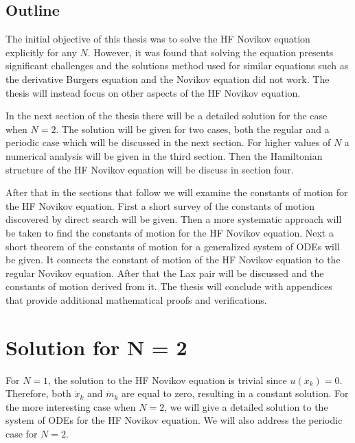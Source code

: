 \documentclass[english,master]{liumaiex}
\theoremstyle{plain}
\theoremstyle{definition}
\begin{document}
\subsection{Outline}

The initial objective of this thesis was to solve the HF Novikov equation explicitly for any $N$. However, it was found that solving the equation presents significant challenges and the solutions method used for similar equations such as the derivative Burgers equation and the Novikov equation did not work. The thesis will instead focus on other aspects of the HF Novikov equation.

In the next section of the thesis there will be a detailed solution for the case when $N = 2$. The solution will be given for two cases, both the regular and a periodic case which will be discussed in the next section. For higher values of $N$ a numerical analysis will be given in the third section. Then the Hamiltonian structure of the HF Novikov equation will be discuss in section four.

After that in the sections that follow we will examine the constants of motion for the HF Novikov equation. First a short survey of the constants of motion discovered by direct search will be given. Then a more systematic approach will be taken to find the constants of motion for the HF Novikov equation. Next a short theorem of the constants of motion for a generalized system of ODEs will be given. It connects the constant of motion of the HF Novikov equation to the regular Novikov equation. After that the Lax pair will be discussed and the constants of motion derived from it. The thesis will conclude with appendices that provide additional mathematical proofs and verifications.

\section{Solution for N = 2}

For $N = 1$, the solution to the HF Novikov equation is trivial since $u(x_k) = 0$. Therefore, both $\dot{x}_k$ and $\dot{m}_k$ are equal to zero, resulting in a constant solution. For the more interesting case when $N = 2$, we will give a detailed solution to the system of ODEs for the HF Novikov equation. We will also address the periodic case for $N = 2$.
\end{document}
